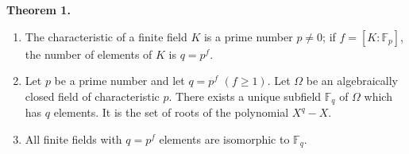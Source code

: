 \textbf{Theorem 1.}
\begin{enumerate}
\item[(i)] The characteristic of a finite field $K$ is a prime number $p \neq 0$; if $f = [K:\mathbb{F}_p]$, the number of elements of $K$ is $q = p^f$.
\item[(ii)] Let $p$ be a prime number and let $q = p^f$ $(f \geq 1)$. Let $\Omega$ be an algebraically closed field of characteristic $p$. There exists a unique subfield $\mathbb{F}_q$ of $\Omega$ which has $q$ elements. It is the set of roots of the polynomial $X^q - X$.
\item[(iii)] All finite fields with $q = p^f$ elements are isomorphic to $\mathbb{F}_q$.
\end{enumerate}
